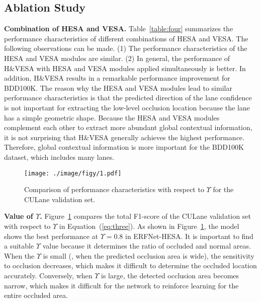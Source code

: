 \documentclass[10pt,twocolumn,letterpaper]{article}
\begin{document}
\subsection{Ablation Study}
\label{ablation}

\noindent
\textbf{Combination of HESA and VESA.} Table~\ref{table:four} summarizes the performance characteristics of different combinations of HESA and VESA. The following observations can be made. (1) The performance characteristics of the HESA and VESA modules are similar. (2) In general, the performance of H\&VESA with HESA and VESA modules applied simultaneously is better. In addition, H\&VESA results in a remarkable performance improvement for BDD100K. The reason why the HESA and VESA modules lead to similar performance characteristics is that the predicted direction of the lane confidence is not important for extracting the low-level occlusion location because the lane has a simple geometric shape. Because the HESA and VESA modules complement each other to extract more abundant global contextual information, it is not surprising that H\&VESA generally achieves the highest performance. Therefore, global contextual information is more important for the BDD100K dataset, which includes many lanes.

\begin{figure}
	\setlength{\belowcaptionskip}{-24pt}
	\begin{center}
		\texttt{[image: ./image/figy/1.pdf]}
		\vspace{-3ex}
		\caption{Comparison of performance characteristics with respect to $\Upsilon$ for the CULane validation set.}
		\label{fig:graph}
	\end{center}
\end{figure}

\noindent
\textbf{Value of $\Upsilon$.} Figure~\ref{fig:graph} compares the total F1-score of the CULane validation set with respect to $\Upsilon$ in Equation~(\ref{eq:three}). As shown in Figure~\ref{fig:graph}, the model shows the best performance at $\Upsilon=0.8$ in ERFNet-HESA. It is important to find a suitable $\Upsilon$ value because it determines the ratio of occluded and normal areas. When the $\Upsilon$ is small (\ie, when the predicted occlusion area is wide), the sensitivity to occlusion decreases, which makes it difficult to determine the occluded location accurately. Conversely, when $\Upsilon$ is large, the detected occlusion area becomes narrow, which makes it difficult for the network to reinforce learning for the entire occluded area.
\end{document}
